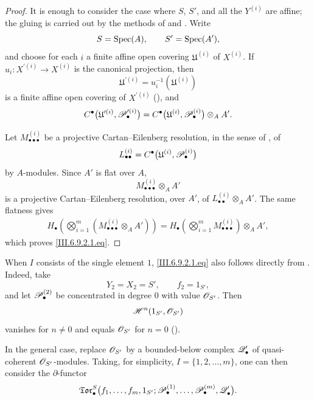 \begin{proof}
It is enough to consider the case where $S$, $S'$, and all the
$Y^{(i)}$ are affine; the gluing is carried out by the methods of
 and .  Write
\[
  S=\operatorname{Spec}(A),
  \qquad
  S'=\operatorname{Spec}(A'),
\]
and choose for each $i$ a finite affine open covering
$\mathfrak U^{(i)}$ of $X^{(i)}$.  If
$u_i:X^{\prime(i)}\to X^{(i)}$ is the canonical projection, then
\[
  \mathfrak U^{\prime(i)}
  =
  u_i^{-1}(\mathfrak U^{(i)})
\]
is a finite affine open covering of $X^{\prime(i)}$
(), and
\[
  C^\bullet
  \bigl(
    \mathfrak U^{\prime(i)},\mathscr{P}_\bullet^{\prime(i)}
  \bigr)
  =
  C^\bullet
  \bigl(
    \mathfrak U^{(i)},\mathscr{P}_\bullet^{(i)}
  \bigr)
  \otimes_AA'.
\]

Let $M_{\bullet\bullet\bullet}^{(i)}$ be a projective
Cartan--Eilenberg resolution, in the sense of
, of
\[
  L_{\bullet\bullet}^{(i)}
  =
  C^\bullet
  \bigl(
    \mathfrak U^{(i)},\mathscr{P}_\bullet^{(i)}
  \bigr)
\]
by $A$-modules.  Since $A'$ is flat over $A$,
\[
  M_{\bullet\bullet\bullet}^{(i)}\otimes_AA'
\]
is a projective Cartan--Eilenberg resolution, over $A'$, of
$L_{\bullet\bullet}^{(i)}\otimes_AA'$.  The same flatness gives
\[
\begin{split}
  H_\bullet
  \left(
    \bigotimes_{i=1}^{m}
    (M_{\bullet\bullet\bullet}^{(i)}\otimes_AA')
  \right)
  =
  H_\bullet
  \left(
    \bigotimes_{i=1}^{m}
    M_{\bullet\bullet\bullet}^{(i)}
  \right)
  \otimes_AA',
\end{split}
\]
which proves \eqref{III.6.9.2.1.eq}.
\end{proof}

\begin{env}[6.9.2.2]
\label{III.6.9.2.2}
When $I$ consists of the single element $1$,
\eqref{III.6.9.2.1.eq} also follows directly from
.  Indeed, take
\[
  Y_2=X_2=S',
  \qquad
  f_2=1_{S'},
\]
and let $\mathscr{P}_\bullet^{(2)}$ be concentrated in degree $0$ with
value $\mathscr{O}_{S'}$.  Then
\[
  \mathscr{H}^n(1_{S'},\mathscr{O}_{S'})
\]
vanishes for $n\neq0$ and equals $\mathscr{O}_{S'}$ for $n=0$
().
\end{env}

In the general case, replace $\mathscr{O}_{S'}$ by a bounded-below
complex $\mathscr{Q}_\bullet'$ of quasi-coherent
$\mathscr{O}_{S'}$-modules.  Taking, for simplicity,
$I=\{1,2,\ldots,m\}$, one can then consider the
$\partial$-functor
\[
  \mathfrak{Tor}_\bullet^S
  \bigl(
    f_1,\ldots,f_m,1_{S'};
    \mathscr{P}_\bullet^{(1)},\ldots,\mathscr{P}_\bullet^{(m)},
    \mathscr{Q}_\bullet'
  \bigr).
\]

